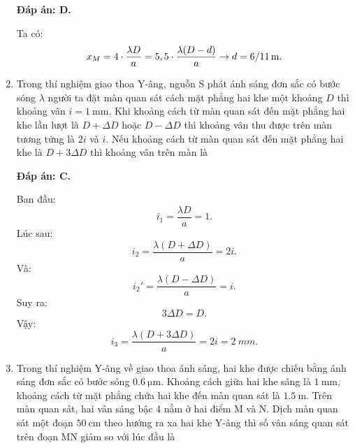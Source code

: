 \begin{enumerate}[label=\bfseries Câu \arabic*:]
	\loigiai
	{		\textbf{Đáp án: D.}
		
Ta có:
$$
	x_{M} = 4 \cdot \dfrac{\lambda D}{a} = 5,5 \cdot \dfrac{\lambda (D-d)}{a} \rightarrow d = \xsi{6/11}{m}.
$$
		
	}
	
	\item {} 
	
	\cauhoi
	{Trong thí nghiệm giao thoa Y-âng, nguồn S phát ánh sáng đơn sắc có bước sóng $\lambda$ người ta đặt màn quan sát cách mặt phẳng hai khe một khoảng $D$ thì khoảng vân $i=\SI{1}{\milli \meter}$. Khi khoảng cách từ màn quan sát đến mặt phẳng hai khe lần lượt là $D+\Delta D$ hoặc $D-\Delta D$ thì khoảng vân thu được trên màn tương tứng là $2i$ và $i$. Nếu khoảng cách từ màn quan sát đến mặt phẳng hai khe là $D+3\Delta D$ thì khoảng vân trên màn là
	}
	
	\loigiai
	{		\textbf{Đáp án: C.}
		
Ban đầu:
$$
	i_{1} = \dfrac{\lambda D}{a} = 1.
$$
Lúc sau:
$$
	i_{2} = \dfrac{\lambda (D + \Delta D)}{a} = 2i. 
$$
Và:
$$
i_{2}' = \dfrac{\lambda (D - \Delta D)}{a} = i. 
$$
Suy ra:
$$
	3\Delta D = D.
$$		
Vậy:
$$
	i_{3} = \dfrac{\lambda (D + 3\Delta D)}{a} = 2i = \SI{2}{mm}.
$$
	}
	
	\item {} 
	
	\cauhoi
	{Trong thí nghiệm Y-âng về giao thoa ánh sáng, hai khe được chiếu bằng ánh sáng đơn sắc có bước sóng $\SI{0.6}{\micro \meter}$. Khoảng cách giữa hai khe sáng là $\SI{1}{\milli \meter}$, khoảng cách từ mặt phẳng chứa hai khe đến màn quan sát là $\SI{1.5}{\meter}$. Trên màn quan sát, hai vân sáng bậc 4 nằm ở hai điểm M và N. Dịch màn quan sát một đoạn $\SI{50}{\centi \meter}$ theo hướng ra xa hai khe Y-âng thì số vân sáng quan sát trên đoạn MN giảm so với lúc đầu là
	}
	

\end{enumerate}
